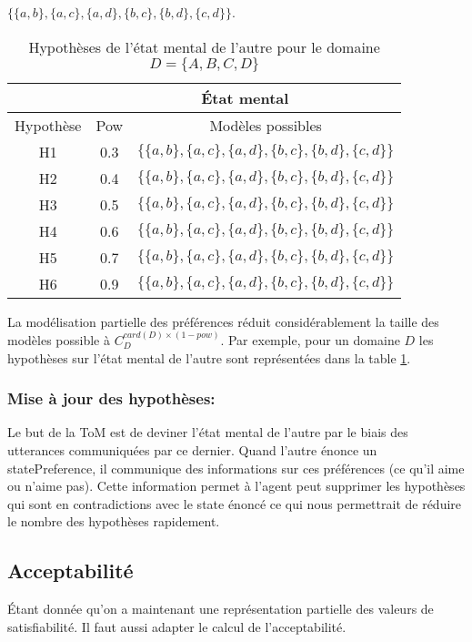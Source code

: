 \documentclass{llncs}
\begin{document}
	$\{ \{a,b\}, \{a,c\}, \{a,d\}, \{b,c\}, \{b,d\}, \{c,d\} \}$.
	
			\begin{table}[h]
				\centering
				\begin{tabular}{ |c|c|c| }
					\hline
					 & \multicolumn{2}{c|}{État mental}  \\
					\hline
					Hypothèse & Pow & Modèles possibles \\
					\hline
					H1&0.3&$\{ \{a,b\}, \{a,c\}, \{a,d\}, \{b,c\}, \{b,d\}, \{c,d\} \}$ \\
					\hline
					H2&0.4&$\{ \{a,b\}, \{a,c\}, \{a,d\}, \{b,c\}, \{b,d\}, \{c,d\} \}$ \\
					\hline
					H3&0.5&$\{ \{a,b\}, \{a,c\}, \{a,d\}, \{b,c\}, \{b,d\}, \{c,d\} \}$\\
					\hline
					H4&0.6&$\{ \{a,b\}, \{a,c\}, \{a,d\}, \{b,c\}, \{b,d\}, \{c,d\} \}$ \\
					\hline
					H5&0.7&$\{ \{a,b\}, \{a,c\}, \{a,d\}, \{b,c\}, \{b,d\}, \{c,d\} \}$\\
				\hline
					H6&0.9&$\{ \{a,b\}, \{a,c\}, \{a,d\}, \{b,c\}, \{b,d\}, \{c,d\} \}$ \\
					\hline
				\end{tabular}
				\caption{Hypothèses de l'état mental de l'autre pour le domaine $D=\{A, B, C, D\}$}
				\label{table:poss}
			\end{table}
	
	
	La modélisation partielle des préférences réduit considérablement la taille des modèles possible  à $C_{D}^{card(D) \times (1-pow)}$. Par exemple, pour un domaine $D$ les hypothèses sur l'état mental de l'autre sont représentées dans la table \ref{table:poss}.
	
	\subsubsection{Mise à jour des hypothèses:}
		Le but de la ToM est de deviner l'état mental de l'autre par le biais des utterances communiquées par ce dernier. Quand l'autre énonce un statePreference, il communique des informations sur ces préférences (ce qu'il aime ou n'aime pas). Cette information permet à  l'agent peut supprimer les hypothèses qui sont en contradictions avec le state énoncé ce qui nous permettrait de réduire le nombre des hypothèses rapidement.  
	
	
	\subsection{Acceptabilité}
	Étant donnée qu'on a maintenant une représentation partielle des valeurs de satisfiabilité. Il faut aussi adapter le calcul de l'acceptabilité.
	
\end{document}
